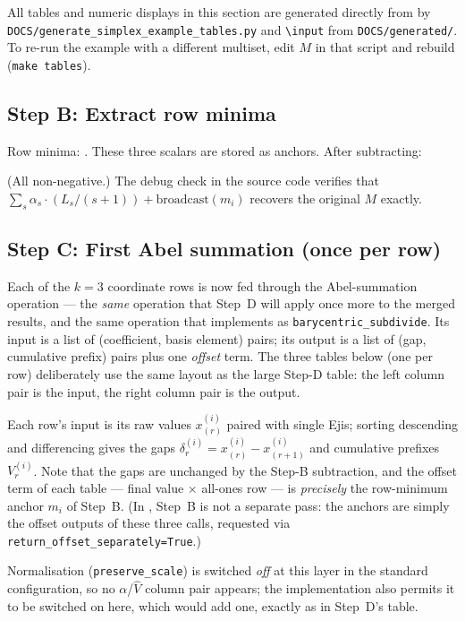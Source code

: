 All tables and numeric displays in this section are generated directly from
\encdecpy{} by \texttt{DOCS/generate\_simplex\_example\_tables.py} and
\texttt{\textbackslash input} from \texttt{DOCS/generated/}.  To re-run the
example with a different multiset, edit $M$ in that script and rebuild
(\texttt{make tables}).



\subsection*{Step B: Extract row minima}

Row minima: .
These three scalars are stored as anchors.  After subtracting:

(All non-negative.)  The debug check in the source code verifies that
$\sum_s \alpha_s \cdot (L_s/(s+1)) + \text{broadcast}(m_i)$ recovers
the original $M$ exactly.

\subsection*{Step C: First Abel summation (once per row)}

\noindent
Each of the $k=3$ coordinate rows is now fed through the Abel-summation
operation — the \emph{same} operation that Step~D will apply once more to the
merged results, and the same operation that \encdecpy{} implements as
\texttt{barycentric\_subdivide}.  Its input is a list of (coefficient, basis
element) pairs; its output is a list of (gap, cumulative prefix) pairs plus
one \emph{offset} term.  The three tables below (one per row) deliberately use
the same layout as the large Step-D table: the left column pair is the input,
the right column pair is the output.

Each row's input is its raw values $x^{(i)}_{(r)}$ paired with single Ejis;
sorting descending and differencing gives the gaps
$\delta^{(i)}_r = x^{(i)}_{(r)} - x^{(i)}_{(r+1)}$ and cumulative prefixes
$V^{(i)}_r$.  Note that the gaps are unchanged by the Step-B subtraction, and
the offset term of each table — final value $\times$ all-ones row — is
\emph{precisely} the row-minimum anchor $m_i$ of Step~B.  (In \encdecpy{},
Step~B is not a separate pass: the anchors are simply the offset outputs of
these three calls, requested via \texttt{return\_offset\_separately=True}.)



\noindent
Normalisation (\texttt{preserve\_scale}) is switched \emph{off} at this layer
in the standard configuration, so no $\alpha$/$\hat{V}$ column pair appears;
the \algtwobpy{} implementation also permits it to be switched on here, which
would add one, exactly as in Step~D's table.

